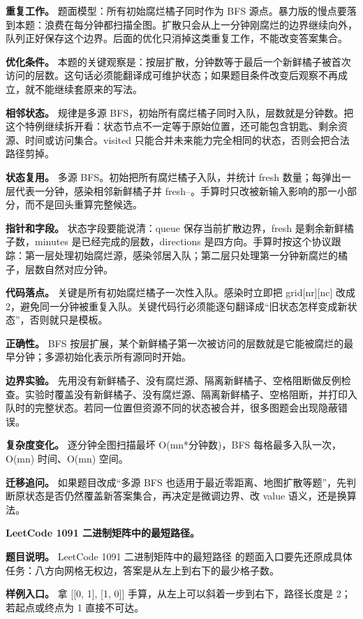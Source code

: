 \textbf{重复工作。} 题面模型：所有初始腐烂橘子同时作为 BFS 源点。暴力版的慢点要落到本题：浪费在每分钟都扫描全图。扩散只会从上一分钟刚腐烂的边界继续向外，队列正好保存这个边界。后面的优化只消掉这类重复工作，不能改变答案集合。

\textbf{优化条件。} 本题的关键观察是：按层扩散，分钟数等于最后一个新鲜橘子被首次访问的层数。这句话必须能翻译成可维护状态；如果题目条件改变后观察不再成立，就不能继续套原来的写法。

\textbf{相邻状态。} 规律是多源 BFS，初始所有腐烂橘子同时入队，层数就是分钟数。把这个特例继续拆开看：状态节点不一定等于原始位置，还可能包含钥匙、剩余资源、时间或访问集合。visited 只能合并未来能力完全相同的状态，否则会把合法路径剪掉。

\textbf{状态复用。} 多源 BFS。初始把所有腐烂橘子入队，并统计 fresh 数量；每弹出一层代表一分钟，感染相邻新鲜橘子并 fresh--。手算时只改被新输入影响的那一小部分，而不是回头重算完整候选。

\textbf{指针和字段。} 状态字段要能说清：queue 保存当前扩散边界，fresh 是剩余新鲜橘子数，minutes 是已经完成的层数，directions 是四方向。手算时按这个协议跟踪：第一层处理初始腐烂源，感染邻居入队；第二层只处理第一分钟新腐烂的橘子，层数自然对应分钟。

\textbf{代码落点。} 关键是所有初始腐烂橘子一次性入队。感染时立即把 grid[nr][nc] 改成 2，避免同一分钟被重复入队。关键代码行必须能逐句翻译成“旧状态怎样变成新状态”，否则就只是模板。

\textbf{正确性。} BFS 按层扩展，某个新鲜橘子第一次被访问的层数就是它能被腐烂的最早分钟；多源初始化表示所有源同时开始。

\textbf{边界实验。} 先用没有新鲜橘子、没有腐烂源、隔离新鲜橘子、空格阻断做反例检查。实验时覆盖没有新鲜橘子、没有腐烂源、隔离新鲜橘子、空格阻断，并打印入队时的完整状态。若同一位置但资源不同的状态被合并，很多图题会出现隐蔽错误。

\textbf{复杂度变化。} 逐分钟全图扫描最坏 O(mn*分钟数)，BFS 每格最多入队一次，O(mn) 时间、O(mn) 空间。

\textbf{迁移追问。} 如果题目改成“多源 BFS 也适用于最近零距离、地图扩散等题”，先判断原状态是否仍然覆盖新答案集合，再决定是微调边界、改 value 语义，还是换算法。

\noindent\textbf{LeetCode 1091 二进制矩阵中的最短路径。}

\textbf{题目说明。} LeetCode 1091 二进制矩阵中的最短路径 的题面入口要先还原成具体任务：八方向网格无权边，答案是从左上到右下的最少格子数。

\textbf{样例入口。} 拿 [[0, 1], [1, 0]] 手算，从左上可以斜着一步到右下，路径长度是 2；若起点或终点为 1 直接不可达。

